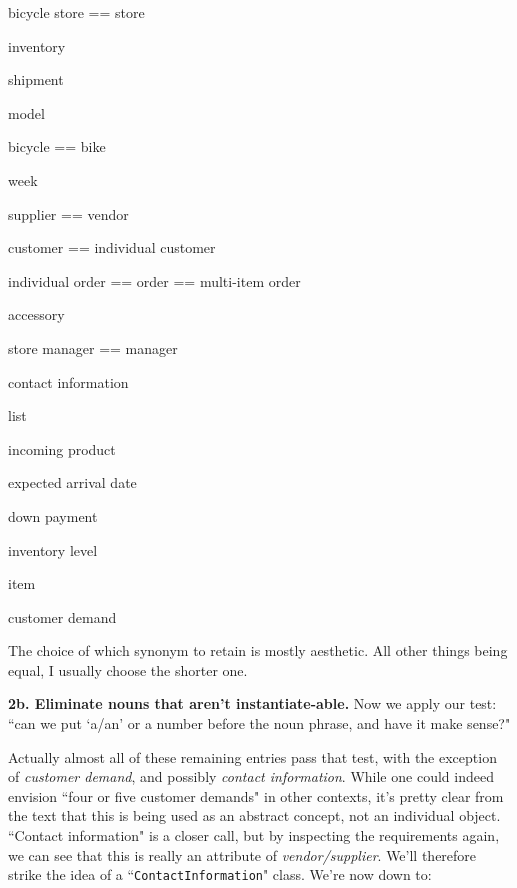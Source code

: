 \begin{samepage}
\begin{multicols}{2}
\small
\begin{compactitem}
\renewcommand\labelitemi{\raisebox{0.25ex}{\small$\bullet$}}
\item \textsf{bicycle store == store}
\item \textsf{inventory}
\item \textsf{shipment}
\item \textsf{model}
\item \textsf{bicycle == bike}
\item \textsf{week}
\item \textsf{supplier == vendor}
\item \textsf{customer == individual customer}
\item \textsf{individual order == order == multi-item order}
\columnbreak
\item \textsf{accessory}
\item \textsf{store manager == manager}
\item \textsf{contact information}
\item \textsf{list}
\item \textsf{incoming product}
\item \textsf{expected arrival date}
\item \textsf{down payment}
\item \textsf{inventory level}
\item \textsf{item}
\item \textsf{customer demand}
\end{compactitem}
\end{multicols}
\end{samepage}

The choice of which synonym to retain is mostly aesthetic. All other things
being equal, I usually choose the shorter one.

\vspace{.3in}
\textbf{2b. Eliminate nouns that aren't instantiate-able.} Now we apply our
test: ``can we put `a/an' or a number before the noun phrase, and have it make
sense?"

Actually almost all of these remaining entries pass that test, with the
exception of \textit{customer demand}, and possibly \textit{contact
information}. While one could indeed envision ``four or five customer demands"
in other contexts, it's pretty clear from the text that this is being used as
an abstract concept, not an individual object. ``Contact information" is a
closer call, but by inspecting the requirements again, we can see that this is
really an attribute of \textit{vendor/supplier}. We'll therefore strike the
idea of a ``\texttt{ContactInformation}" class. We're now down to:

